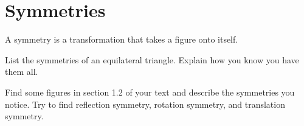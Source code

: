 \newpage

\section{Symmetries}
\begin{definition}
A symmetry is a transformation that takes a figure onto itself.  
\end{definition}
\begin{prob}
List the symmetries of an equilateral triangle.  Explain how you know you have them all.  
\end{prob}


\begin{prob}
Find some figures in section 1.2 of your text and describe the symmetries you notice.  Try to find reflection symmetry, rotation symmetry, and translation symmetry.  
\end{prob}

